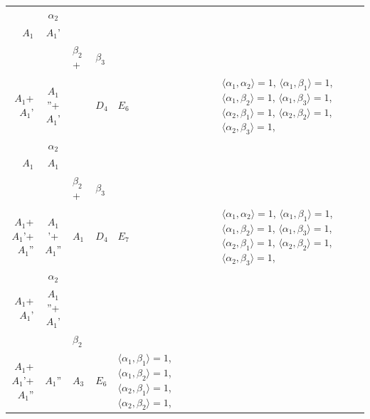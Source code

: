 \documentclass[12pt]{report}
\begin{document}
\begin{appendix}
{\begin{longtable}{rcl p{1cm}p{1cm}p{3cm} }
\\
\begin{tabular}{cc}$\alpha_1$+ & $\alpha_2$\\\tiny{ $A_1$ } & \tiny{ $A_1$' }\end{tabular} &\begin{tabular}{c} = \\~ \end{tabular} & \begin{tabular}{ccc}$\beta_1$+ & $\beta_2$+ & $\beta_3$\\\tiny{ $A_1$+$A_1$' } & \tiny{ $A_1$''+$A_1$' } & \tiny{  }\end{tabular} & $D_4$ & $E_6$ & $\langle\alpha_1, \alpha_2\rangle=1$,  $\langle\alpha_1, \beta_1\rangle=1$, $\langle\alpha_1, \beta_2\rangle=1$, $\langle\alpha_1, \beta_3\rangle=1$, $\langle\alpha_2, \beta_1\rangle=1$, $\langle\alpha_2, \beta_2\rangle=1$, $\langle\alpha_2, \beta_3\rangle=1$, 
\\
\begin{tabular}{cc}$\alpha_1$+ & $\alpha_2$\\\tiny{ $A_1$ } & \tiny{ $A_1$ }\end{tabular} &\begin{tabular}{c} = \\~ \end{tabular} & \begin{tabular}{ccc}$\beta_1$+ & $\beta_2$+ & $\beta_3$\\\tiny{ $A_1$+$A_1$'+$A_1$'' } & \tiny{ $A_1$'+$A_1$'' } & \tiny{ $A_1$ }\end{tabular} & $D_4$ & $E_7$ & $\langle\alpha_1, \alpha_2\rangle=1$,  $\langle\alpha_1, \beta_1\rangle=1$, $\langle\alpha_1, \beta_2\rangle=1$, $\langle\alpha_1, \beta_3\rangle=1$, $\langle\alpha_2, \beta_1\rangle=1$, $\langle\alpha_2, \beta_2\rangle=1$, $\langle\alpha_2, \beta_3\rangle=1$, 
\\
\begin{tabular}{cc}$\alpha_1$+ & $\alpha_2$\\\tiny{ $A_1$+$A_1$' } & \tiny{ $A_1$''+$A_1$' }\end{tabular} &\begin{tabular}{c} = \\~ \end{tabular} & \begin{tabular}{cc}$\beta_1$+ & $\beta_2$\\\tiny{ $A_1$+$A_1$'+$A_1$'' } & \tiny{ $A_1$'' }\end{tabular} & $A_3$ & $E_6$ &  $\langle\alpha_1, \beta_1\rangle=1$, $\langle\alpha_1, \beta_2\rangle=1$, $\langle\alpha_2, \beta_1\rangle=1$, $\langle\alpha_2, \beta_2\rangle=1$, 

\end{longtable}}
\end{appendix}
\end{document}
